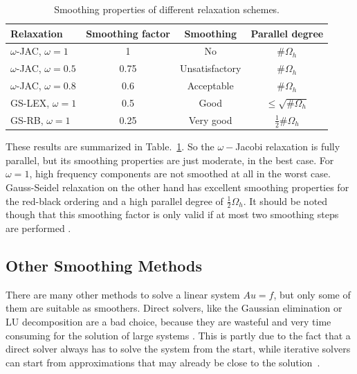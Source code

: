 \begin{table}[]
\centering
\caption{Smoothing properties of different relaxation schemes.}
\label{table:smoothing}
\begin{tabular}{lccc}
\hline
\multicolumn{1}{l}{Relaxation} & \multicolumn{1}{l}{Smoothing factor} & Smoothing & \multicolumn{1}{l}{Parallel degree} \\ \hline
$\omega$-JAC, $\omega = 1$     & 1                                    & No                            & \#$\Omega_h$                        \\
$\omega$-JAC, $\omega = 0.5$   & 0.75                                 & Unsatisfactory                & \#$\Omega_h$                        \\
$\omega$-JAC, $\omega = 0.8$   & 0.6                                  & Acceptable                    & \#$\Omega_h$                        \\
GS-LEX, $\omega = 1$           & 0.5                                  & Good                          & $\leq \sqrt{\#\Omega_h}$        \\
GS-RB, $\omega = 1$            & 0.25                                 & Very good                     & $\frac{1}{2}\#\Omega_h$                         
\end{tabular}
\end{table}

These results are summarized in Table.~\ref{table:smoothing}. So the $\omega-$Jacobi relaxation is fully parallel, but its smoothing properties are just moderate, in the best case. For $\omega = 1$, high frequency components are not smoothed at all in the worst case. Gauss-Seidel relaxation on the other hand has excellent smoothing properties for the red-black ordering and a high parallel degree of $\frac{1}{2}\Omega_h$. It should be noted though that this smoothing factor is only valid if at most two smoothing steps are performed \cite{Trottenberg:2000:MUL:374106}. 


\subsection{Other Smoothing Methods}
There are many other methods to solve a linear system $Au = f$, but only some of them are suitable as smoothers. Direct solvers, like the Gaussian elimination or LU decomposition are a bad choice, because they are wasteful and very time consuming for the solution of large systems \cite{mazumder2015numerical}. This is partly due to the fact that a direct solver always has to solve the system from the start, while iterative solvers can start from approximations that may already be close to the solution~\cite{ascher2011first}.

